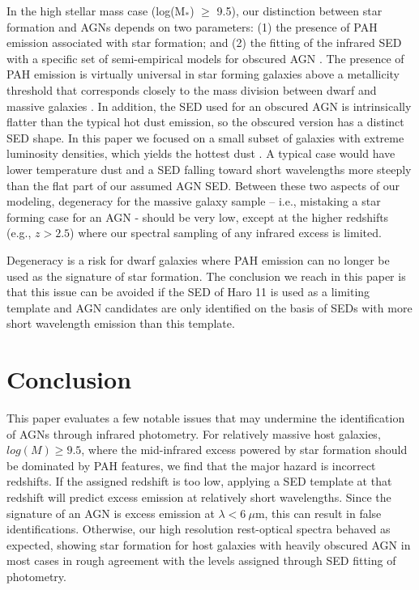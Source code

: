 \documentclass[twocolumn]{aastex63}
\begin{document}
{In the high stellar mass case (log(M$_*$) $\ge$ 9.5), our  distinction between star formation and AGNs depends on two parameters: (1) the presence of PAH emission associated with star formation; and (2) the fitting of the infrared SED with a specific set of semi-empirical models for obscured AGN \citep{Lyu2022}.
The presence of PAH emission is virtually universal in star forming galaxies above a metallicity threshold that corresponds closely to the mass division between dwarf and massive galaxies \citep[e.g.,][]{Marble2010, Remy2015, Shivaei2024, Whitcomb2024}. In addition, the SED used for an obscured AGN is intrinsically flatter than the typical hot dust emission, so the obscured version has a distinct SED shape. In this paper we focused on a small subset of galaxies with extreme luminosity densities, which yields the hottest dust \citep{Remy2015}. A typical case would have lower temperature dust and a SED falling toward short wavelengths more steeply than the flat part of our assumed AGN SED. Between these two aspects of our modeling, degeneracy for the massive galaxy sample -- i.e., mistaking a star forming case for an AGN - should be very low, except at the higher redshifts (e.g., $z > 2.5$) where our spectral sampling of any infrared excess is limited. 

Degeneracy is a risk for dwarf galaxies where PAH emission can no longer be used as the signature of star formation. The conclusion we reach in this paper is that this issue can be avoided if the SED of Haro 11 is used as a limiting template and AGN candidates are only identified on the basis of SEDs with more short wavelength emission than this template.


\section{Conclusion}


This paper evaluates a few notable issues that may undermine the identification
of AGNs through infrared photometry. For relatively massive host galaxies,
$log(M) \ge 9.5$, where the mid-infrared excess powered by star formation should
be dominated by PAH features, we find that the major hazard is incorrect
redshifts. If the assigned redshift is too low, applying a SED template at that
redshift will predict excess emission at relatively short wavelengths. Since the
signature of an AGN is excess emission at $\lambda < 6 ~\mu$m, this can result
in false identifications. Otherwise, our high resolution rest-optical spectra
behaved as expected, showing star formation for host galaxies with heavily
obscured AGN  in most cases in rough agreement with the levels assigned
through SED fitting of photometry. 

}
\end{document}
